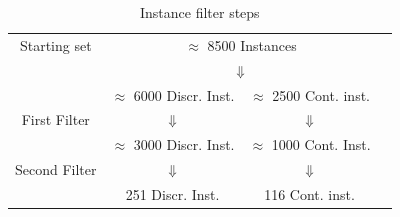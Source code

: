 \begin{center}
\begin{table}[]
 \centering

 \setlength{\tabcolsep}{5pt}
\begin{tabular}{cccc}
Starting set& \multicolumn{ 2}{c}{ $\approx$ 8500 Instances }& \\
& \multicolumn{ 2}{c}{$\Downarrow$}& \\
& $\approx$ 6000 Discr. Inst.  & $\approx$ 2500 Cont. inst. & \\
First Filter  & $\Downarrow$  & $\Downarrow$ & \\
 & $\approx$ 3000 Discr. Inst.  & $\approx$ 1000 Cont. Inst. & \\
Second Filter & $\Downarrow$  & $\Downarrow$  & \\
  & 251 Discr. Inst.  & 116  Cont. inst. & \\
\end{tabular}
\caption{Instance filter steps} \label{tab:filters}
\end{table}
\end{center}



